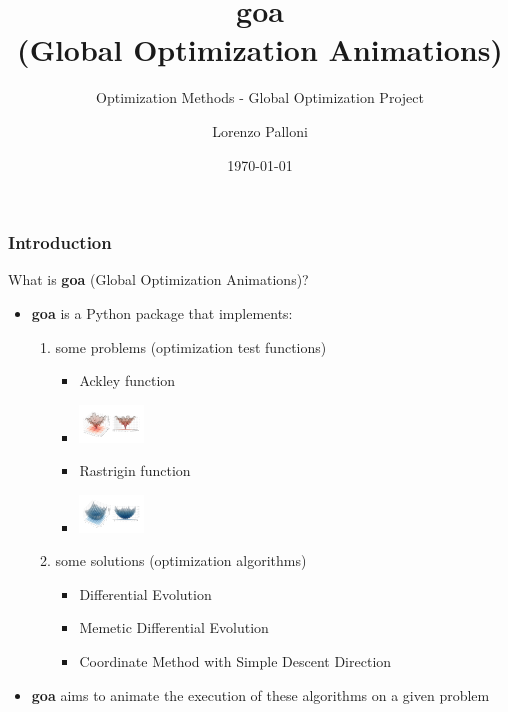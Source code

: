 \documentclass{beamer}
\title[OM - 2021/22 - Lorenzo Palloni]{goa\\ (Global Optimization Animations)}
\subtitle{Optimization Methods - Global Optimization Project}
\author{Lorenzo Palloni}
\institute[]{
  University of Florence\\
  \medskip
  \textit{lorenzo.palloni@stud.unifi.it}
}
\date{\today}
\begin{document}
\begin{frame}
\titlepage %
\end{frame}

\begin{frame}
\frametitle{Introduction}
  What is \textbf{goa} (Global Optimization Animations)?
  \begin{itemize}
    \item \textbf{goa} is a Python package that implements:
    \begin{enumerate}
      \item some problems (optimization test functions)
     \begin{itemize}
       \item Ackley function
       \item[] \includegraphics[width=0.15\textwidth]{figures/introduction-ackley}
       \item Rastrigin function
       \item[] \includegraphics[width=0.15\textwidth]{figures/introduction-rastrigin}
     \end{itemize}
      \item some solutions (optimization algorithms)
      \begin{itemize}
        \item Differential Evolution \cite{de-original}
        \item Memetic Differential Evolution \cite{mde-2021}
        \item Coordinate Method with Simple Descent Direction \cite{textbook}
      \end{itemize}
    \end{enumerate}
    \item \textbf{goa} aims to animate the execution of these algorithms on a given problem
  \end{itemize}
\end{frame}
\end{document}
